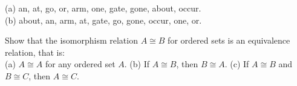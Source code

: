 \documentclass[11pt, a4paper, UTF8]{ctexart}
\begin{document}

\begin{solution}
  (a) an, at, go, or, arm, one, gate, gone, about, occur.\\
  (b) about, an, arm, at, gate, go, gone, occur, one, or.
\end{solution}

\begin{problem}[SM: 14.58]
  Show that the isomorphism relation $A \cong B$ for ordered sets is an 
  equivalence relation, that is:\\
  (a) $A \cong A$ for any ordered set $A$. (b) If $A \cong B$, then $B \cong A$. 
  (c) If $A \cong B$ and $B \cong C$, then $A \cong C$.
\end{problem}
\end{document}
